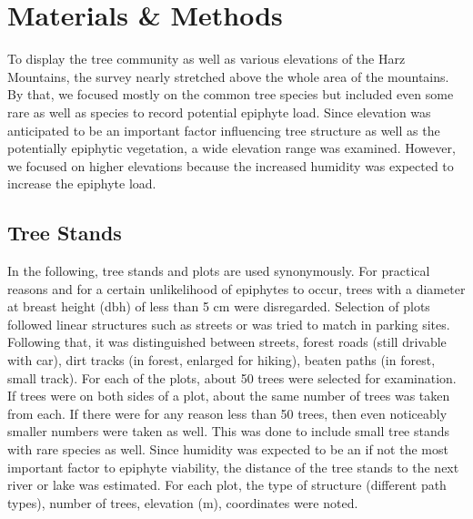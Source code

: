 \documentclass[12pt, a4paper, oneside, draft]{article}
\begin{document}
\section{Materials \& Methods} \label{sec:MM}
To display the tree community as well as various elevations of the Harz Mountains, the survey nearly stretched above the whole area of the mountains. By that, we focused mostly on the common tree species but included even some rare as well as  species to record potential epiphyte load. Since elevation was anticipated to be an important factor  influencing tree structure as well as the potentially epiphytic vegetation, a wide elevation range was examined. However, we focused on higher elevations because the increased humidity was expected to increase the epiphyte load.

	\subsection{Tree Stands}
	In the following, tree stands and plots are used synonymously. For practical reasons and for a certain unlikelihood of epiphytes to occur, trees with a diameter at breast height (dbh) of less than 5 cm were disregarded. Selection of plots followed linear structures such as streets or was tried to match in parking sites. Following that, it was distinguished between streets, forest roads (still drivable with car), dirt tracks (in forest, enlarged for hiking), beaten paths (in forest, small track). For each of the plots, about 50 trees were selected for examination. If trees were on both sides of a plot, about the same number of trees was taken from each. If there were for any reason less than 50 trees, then even noticeably smaller numbers were taken as well. This was done to include small tree stands with rare species as well. Since humidity was expected to be an if not the most important factor to epiphyte viability, the distance of the tree stands to the next river or lake was estimated. For each plot, the type of structure (different path types), number of trees, elevation (m), coordinates were noted.
	
\end{document}
